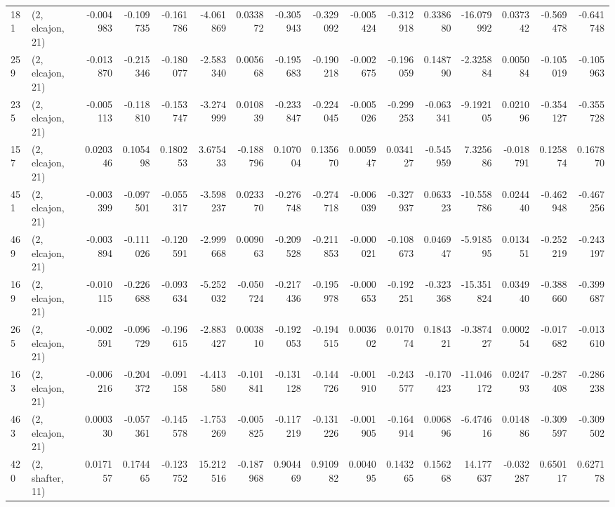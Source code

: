 \begin{tabular}{llrrrrrrrrrrrrrr}
181 &  (2, elcajon, 21) &  -0.004983 & -0.109735 & -0.161786 &   -4.061869 &  0.033872 &  -0.305943 & -0.329092 & -0.005424 & -0.312918 &  0.338680 &  -16.079992 &  0.037342 & -0.569478 & -0.641748 \\
259 &  (2, elcajon, 21) &  -0.013870 & -0.215346 & -0.180077 &   -2.583340 &  0.005668 &  -0.195683 & -0.190218 & -0.002675 & -0.196059 &  0.148790 &   -2.325884 &  0.005084 & -0.105019 & -0.105963 \\
235 &  (2, elcajon, 21) &  -0.005113 & -0.118810 & -0.153747 &   -3.274999 &  0.010839 &  -0.233847 & -0.224045 & -0.005026 & -0.299253 & -0.063341 &   -9.192105 &  0.021096 & -0.354127 & -0.355728 \\
157 &  (2, elcajon, 21) &   0.020346 &  0.105498 &  0.180253 &    3.675433 & -0.188796 &   0.107004 &  0.135670 &  0.005947 &  0.034127 & -0.545959 &    7.325686 & -0.018791 &  0.125874 &  0.167870 \\
451 &  (2, elcajon, 21) &  -0.003399 & -0.097501 & -0.055317 &   -3.598237 &  0.023370 &  -0.276748 & -0.274718 & -0.006039 & -0.327937 &  0.063323 &  -10.558786 &  0.024440 & -0.462948 & -0.467256 \\
469 &  (2, elcajon, 21) &  -0.003894 & -0.111026 & -0.120591 &   -2.999668 &  0.009063 &  -0.209528 & -0.211853 & -0.000021 & -0.108673 &  0.046947 &   -5.918595 &  0.013451 & -0.252219 & -0.243197 \\
169 &  (2, elcajon, 21) &  -0.010115 & -0.226688 & -0.093634 &   -5.252032 & -0.050724 &  -0.217436 & -0.195978 & -0.000653 & -0.192251 & -0.323368 &  -15.351824 &  0.034940 & -0.388660 & -0.399687 \\
265 &  (2, elcajon, 21) &  -0.002591 & -0.096729 & -0.196615 &   -2.883427 &  0.003810 &  -0.192053 & -0.194515 &  0.003602 &  0.017074 &  0.184321 &   -0.387427 &  0.000254 & -0.017682 & -0.013610 \\
163 &  (2, elcajon, 21) &  -0.006216 & -0.204372 & -0.091158 &   -4.413580 & -0.101841 &  -0.131128 & -0.144726 & -0.001910 & -0.243577 & -0.170423 &  -11.046172 &  0.024793 & -0.287408 & -0.286238 \\
463 &  (2, elcajon, 21) &   0.000330 & -0.057361 & -0.145578 &   -1.753269 & -0.005825 &  -0.117219 & -0.131226 & -0.001905 & -0.164914 &  0.006896 &   -6.474616 &  0.014886 & -0.309597 & -0.309502 \\
420 &  (2, shafter, 11) &   0.017157 &  0.174465 & -0.123752 &   15.212516 & -0.187968 &   0.904469 &  0.910982 &  0.004095 &  0.143265 &  0.156268 &   14.177637 & -0.032287 &  0.650117 &  0.627178 \\

\end{tabular}
